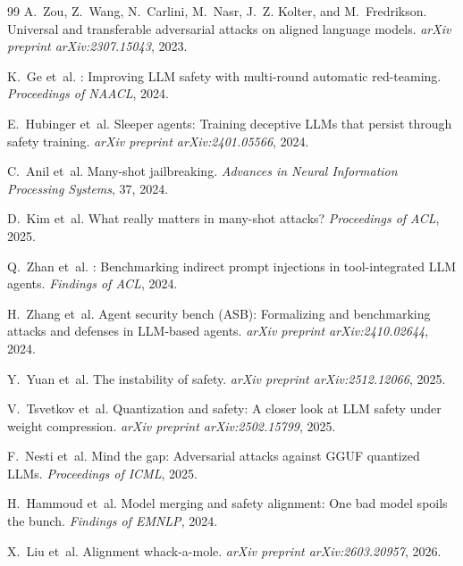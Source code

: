 \documentclass[11pt]{article}
\begin{document}
\begin{thebibliography}{99}
A.~Zou, Z.~Wang, N.~Carlini, M.~Nasr, J.~Z. Kolter, and
M.~Fredrikson.
\newblock Universal and transferable adversarial attacks on aligned
  language models.
\newblock \emph{arXiv preprint arXiv:2307.15043}, 2023.

K.~Ge et~al.
: Improving {LLM} safety with multi-round automatic
  red-teaming.
\newblock \emph{Proceedings of NAACL}, 2024.

E.~Hubinger et~al.
\newblock Sleeper agents: Training deceptive {LLMs} that persist through
  safety training.
\newblock \emph{arXiv preprint arXiv:2401.05566}, 2024.

C.~Anil et~al.
\newblock Many-shot jailbreaking.
\newblock \emph{Advances in Neural Information Processing Systems}, 37, 2024.

D.~Kim et~al.
\newblock What really matters in many-shot attacks?
\newblock \emph{Proceedings of ACL}, 2025.

Q.~Zhan et~al.
: Benchmarking indirect prompt injections in
  tool-integrated {LLM} agents.
\newblock \emph{Findings of ACL}, 2024.

H.~Zhang et~al.
\newblock Agent security bench ({ASB}): Formalizing and benchmarking
  attacks and defenses in {LLM}-based agents.
\newblock \emph{arXiv preprint arXiv:2410.02644}, 2024.

Y.~Yuan et~al.
\newblock The instability of safety.
\newblock \emph{arXiv preprint arXiv:2512.12066}, 2025.

V.~Tsvetkov et~al.
\newblock Quantization and safety: A closer look at {LLM} safety
  under weight compression.
\newblock \emph{arXiv preprint arXiv:2502.15799}, 2025.

F.~Nesti et~al.
\newblock Mind the gap: Adversarial attacks against {GGUF} quantized
  {LLMs}.
\newblock \emph{Proceedings of ICML}, 2025.

H.~Hammoud et~al.
\newblock Model merging and safety alignment: One bad model spoils the
  bunch.
\newblock \emph{Findings of EMNLP}, 2024.

X.~Liu et~al.
\newblock Alignment whack-a-mole.
\newblock \emph{arXiv preprint arXiv:2603.20957}, 2026.


\end{thebibliography}
\end{document}
